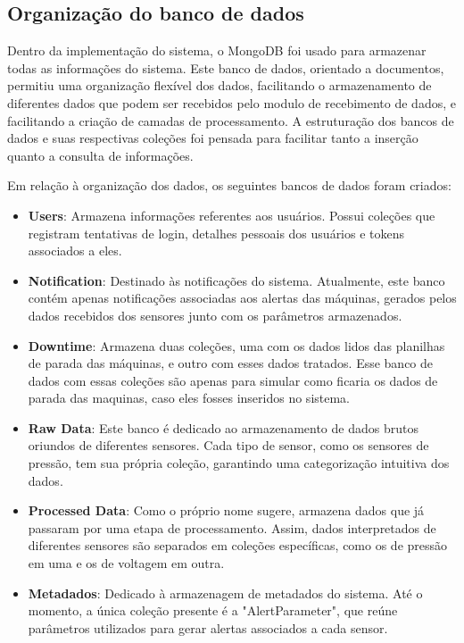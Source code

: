 \subsection[Organização do banco de dados]{Organização do banco de dados}

Dentro da implementação do sistema, o MongoDB foi usado para armazenar todas as informações do sistema. Este banco de dados, orientado a documentos, permitiu uma organização flexível dos dados, facilitando o armazenamento de diferentes dados que podem ser recebidos pelo modulo de recebimento de dados, e facilitando a criação de camadas de processamento. A estruturação dos bancos de dados e suas respectivas coleções foi pensada para facilitar tanto a inserção quanto a consulta de informações.

Em relação à organização dos dados, os seguintes bancos de dados foram criados:

\begin{itemize}
    \item \textbf{Users}: Armazena informações referentes aos usuários. Possui coleções que registram tentativas de login, detalhes pessoais dos usuários e tokens associados a eles.
    
    \item \textbf{Notification}: Destinado às notificações do sistema. Atualmente, este banco contém apenas notificações associadas aos alertas das máquinas, gerados pelos dados recebidos dos sensores junto com os parâmetros armazenados.
    
    \item \textbf{Downtime}: Armazena duas coleções, uma com os dados lidos das planilhas de parada das máquinas, e outro com esses dados tratados. Esse banco de dados com essas coleções são apenas para simular como ficaria os dados de parada das maquinas, caso eles fosses inseridos no sistema.
    
    \item \textbf{Raw Data}: Este banco é dedicado ao armazenamento de dados brutos oriundos de diferentes sensores. Cada tipo de sensor, como os sensores de pressão, tem sua própria coleção, garantindo uma categorização intuitiva dos dados.
    
    \item \textbf{Processed Data}: Como o próprio nome sugere, armazena dados que já passaram por uma etapa de processamento. Assim, dados interpretados de diferentes sensores são separados em coleções específicas, como os de pressão em uma e os de voltagem em outra.
    
    \item \textbf{Metadados}: Dedicado à armazenagem de metadados do sistema. Até o momento, a única coleção presente é a "AlertParameter", que reúne parâmetros utilizados para gerar alertas associados a cada sensor.
\end{itemize}


